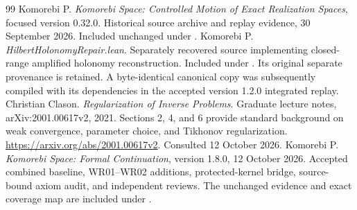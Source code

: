 \begin{thebibliography}{99}
 Komorebi P. \emph{Komorebi Space: Controlled Motion of Exact Realization Spaces}, focused version 0.32.0. Historical source archive and replay evidence, 30 September 2026. Included unchanged under .
 Komorebi P. \emph{HilbertHolonomyRepair.lean}. Separately recovered source implementing closed-range amplified holonomy reconstruction. Included under . Its original separate provenance is retained. A byte-identical canonical copy was subsequently compiled with its dependencies in the accepted version 1.2.0 integrated replay.
 Christian Clason. \emph{Regularization of Inverse Problems}. Graduate lecture notes, arXiv:2001.00617v2, 2021. Sections 2, 4, and 6 provide standard background on weak convergence, parameter choice, and Tikhonov regularization. \url{https://arxiv.org/abs/2001.00617v2}. Consulted 12 October 2026.
 Komorebi P. \emph{Komorebi Space: Formal Continuation}, version 1.8.0, 12 October 2026. Accepted combined baseline, WR01--WR02 additions, protected-kernel bridge, source-bound axiom audit, and independent reviews. The unchanged evidence and exact coverage map are included under .
\end{thebibliography}

